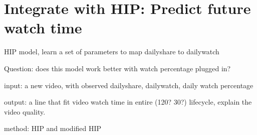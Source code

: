 \section{Integrate with HIP: Predict future watch time}
HIP model, learn a set of parameters to map dailyshare to dailywatch

Question: does this model work better with watch percentage plugged in?

input: a new video, with observed dailyshare, dailywatch, daily watch percentage

output: a line that fit video watch time in entire (120? 30?) lifecycle, explain the video quality.

method: HIP and modified HIP



